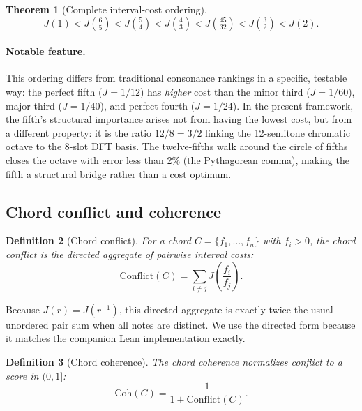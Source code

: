 \documentclass[11pt,a4paper]{article}
\newtheorem{theorem}{Theorem}
\newtheorem{definition}[theorem]{Definition}
\begin{document}
\begin{theorem}[Complete interval-cost ordering]
\label{thm:hierarchy}
\[
  J(1) < J\!\left(\tfrac{6}{5}\right) < J\!\left(\tfrac{5}{4}\right)
  < J\!\left(\tfrac{4}{3}\right) < J\!\left(\tfrac{45}{32}\right)
  < J\!\left(\tfrac{3}{2}\right) < J(2).
\]
\end{theorem}

\paragraph{Notable feature.} This ordering differs from traditional
consonance rankings in a specific, testable way: the perfect fifth
($J=1/12$) has \emph{higher} cost than the minor third ($J=1/60$),
major third ($J=1/40$), and perfect fourth ($J=1/24$). In the present
framework, the fifth's structural importance arises not from having the
lowest cost, but from a different property: it is the ratio $12/8=3/2$
linking the 12-semitone chromatic octave to the 8-slot DFT basis. The
twelve-fifths walk around the circle of fifths closes the octave with
error less than 2\% (the Pythagorean comma), making the fifth a
structural bridge rather than a cost optimum.

\subsection{Chord conflict and coherence}

\begin{definition}[Chord conflict]
\label{def:conflict}
For a chord $C = \{f_1, \ldots, f_n\}$ with $f_i > 0$, the
\emph{chord conflict} is the directed aggregate of pairwise interval
costs:
\begin{equation}
  \label{eq:conflict}
  \mathrm{Conflict}(C) = \sum_{i \neq j} J\!\left(\frac{f_i}{f_j}\right).
\end{equation}
\end{definition}

\noindent Because $J(r)=J(r^{-1})$, this directed aggregate is exactly
twice the usual unordered pair sum when all notes are distinct. We use
the directed form because it matches the companion Lean
implementation exactly.

\begin{definition}[Chord coherence]
\label{def:coherence}
The \emph{chord coherence} normalizes conflict to a score in $(0,1]$:
\begin{equation}
  \label{eq:coherence}
  \mathrm{Coh}(C) = \frac{1}{1 + \mathrm{Conflict}(C)}.
\end{equation}
\end{definition}
\end{document}
